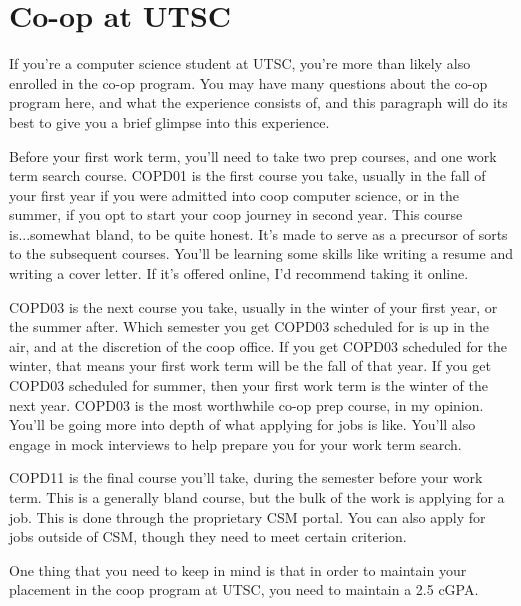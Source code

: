 \documentclass[11pt]{article}
\begin{document}
\section{Co-op at UTSC}
If you're a computer science student at UTSC, you're more than likely also enrolled in the co-op program.  You may have many questions about the co-op program here, and what the experience consists of, and this paragraph will do its best to give you a brief glimpse into this experience.\par
Before your first work term, you'll need to take two prep courses, and one work term search course.  COPD01 is the first course you take, usually in the fall of your first year if you were admitted into coop computer science, or in the summer, if you opt to start your coop journey in second year.  This course is...somewhat bland, to be quite honest.  It's made to serve as a precursor of sorts to the subsequent courses.  You'll be learning some skills like writing a resume and writing a cover letter.  If it's offered online, I'd recommend taking it online.\par
COPD03 is the next course you take, usually in the winter of your first year, or the summer after.  Which semester you get COPD03 scheduled for is up in the air, and at the discretion of the coop office.  If you get COPD03 scheduled for the winter, that means your first work term will be the fall of that year.  If you get COPD03 scheduled for summer, then your first work term is the winter of the next year.  COPD03 is the most worthwhile co-op prep course, in my opinion.  You'll be going more into depth of what applying for jobs is like.  You'll also engage in mock interviews to help prepare you for your work term search.\par
COPD11 is the final course you'll take, during the semester before your work term.  This is a generally bland course, but the bulk of the work is applying for a job.  This is done through the proprietary CSM portal.  You can also apply for jobs outside of CSM, though they need to meet certain criterion.\par
One thing that you need to keep in mind is that in order to maintain your placement in the coop program at UTSC, you need to maintain a 2.5 cGPA.  
\end{document}
